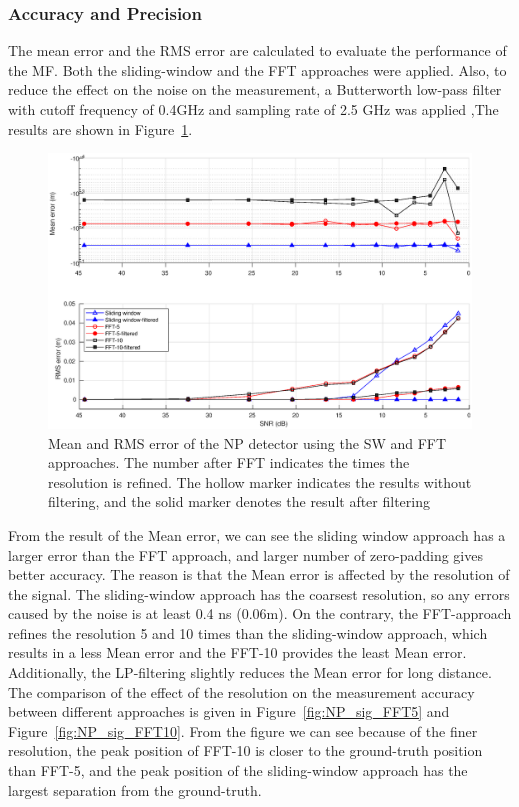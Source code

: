 \subsubsection{Accuracy and Precision}
The mean error and the RMS error are calculated to evaluate the performance of the MF. Both the sliding-window and the FFT approaches were applied. Also, to reduce the effect on the noise on the measurement, a Butterworth low-pass filter with cutoff frequency of 0.4GHz and sampling rate of 2.5 GHz was applied ,The results are shown in Figure~\ref{fig:error_NP_sim}. 
 \begin{figure}[t!p]
\centering
\includegraphics[width=1\textwidth]{figures/chapter_ADC_MF/Error_convVsFFT_filt_unfilt_sim.eps}
\caption{Mean and RMS error of the NP detector using the SW and FFT approaches. The number after FFT indicates the times the resolution is refined. The hollow marker indicates the results without filtering, and the solid marker denotes the result after filtering}
\label{fig:error_NP_sim}
\end{figure}
From the result of the Mean error, we can see the sliding window approach has a larger error than the FFT approach, and larger number of zero-padding gives better accuracy. The reason is that the Mean error is affected by the resolution of the signal. The sliding-window approach has the coarsest resolution, so any errors caused by the noise is at least 0.4 ns (0.06m). On the contrary, the FFT-approach refines the resolution 5 and 10 times than the sliding-window approach, which results in a less Mean error and the FFT-10 provides the least Mean error. Additionally, the LP-filtering slightly reduces the Mean error for long distance. The comparison of the effect of the resolution on the measurement accuracy between different approaches is given in Figure~\ref{fig:NP_sig_FFT5} and Figure~\ref{fig:NP_sig_FFT10}. From the figure we can see because of the finer resolution, the peak position of FFT-10 is closer to the ground-truth position than FFT-5, and the peak position of the sliding-window approach has the largest separation from the ground-truth. \par
